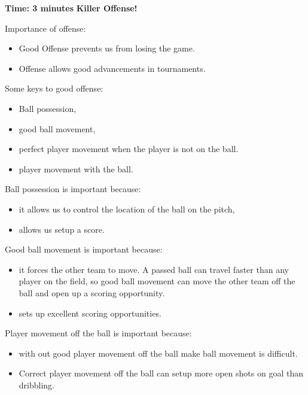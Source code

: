 \documentclass[10pt,letterpaper]{article}
\newenvironment{myalertblock}[1]{%
    \tcolorbox[beamer,%
    noparskip,breakable,
    colback=LightCoral,colframe=DarkRed,%
    colbacklower=Tomato!75!LightCoral,%
    title=#1]}%
    {\endtcolorbox}
\begin{document}
\textbf{Time: 3 minutes}
\begin{myalertblock}{Theme of the Practice}
    \textbf{Killer Offense!}

    Importance of offense:
    \begin{itemize}
        \setlength{\itemsep}{0pt}
        \setlength{\parskip}{0pt}
        \setlength{\parsep}{0pt}
        \item Good Offense prevents us from losing the game.
        \item Offense allows good advancements in tournaments.
    \end{itemize}

    Some keys to good offense:
    \begin{itemize}
        \setlength{\itemsep}{0pt}
        \setlength{\parskip}{0pt}
        \setlength{\parsep}{0pt}
        \item Ball possession,
        \item good ball movement,
        \item perfect player movement when the player is not on the ball.
        \item player movement with the ball.
    \end{itemize}

    Ball possession is important because:
    \begin{itemize}
        \setlength{\itemsep}{0pt}
        \setlength{\parskip}{0pt}
        \setlength{\parsep}{0pt}
        \item it allows us to control the location of the ball on the pitch,
        \item allows us setup a score.
    \end{itemize}

    Good ball movement is important because:
    \begin{itemize}
        \setlength{\itemsep}{0pt}
        \setlength{\parskip}{0pt}
        \setlength{\parsep}{0pt}
        \item it forces the other team to move.  A passed ball can travel faster than any player on the field, so good ball movement can move the other team off the ball and open up a scoring opportunity.
        \item sets up excellent scoring opportunities.
    \end{itemize}

    Player movement off the ball is important because:
    \begin{itemize}
        \setlength{\itemsep}{0pt}
        \setlength{\parskip}{0pt}
        \setlength{\parsep}{0pt}
        \item with out good player movement off the ball make ball movement is difficult.
        \item Correct player movement off the ball can setup more open shots on goal than dribbling.
    \end{itemize}


\end{myalertblock}
\end{document}
